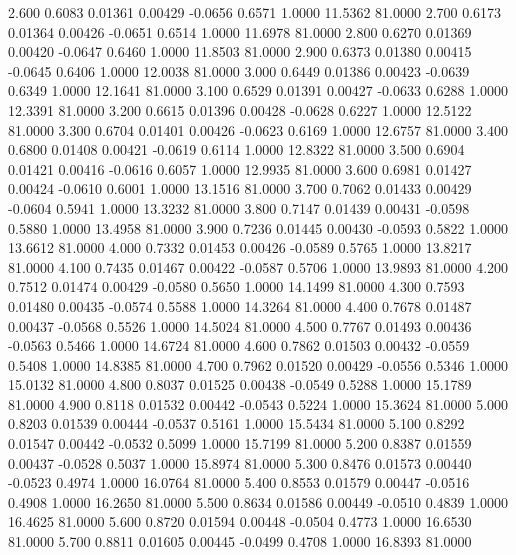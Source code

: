    2.600   0.6083   0.01361   0.00429  -0.0656   0.6571   1.0000  11.5362  81.0000
   2.700   0.6173   0.01364   0.00426  -0.0651   0.6514   1.0000  11.6978  81.0000
   2.800   0.6270   0.01369   0.00420  -0.0647   0.6460   1.0000  11.8503  81.0000
   2.900   0.6373   0.01380   0.00415  -0.0645   0.6406   1.0000  12.0038  81.0000
   3.000   0.6449   0.01386   0.00423  -0.0639   0.6349   1.0000  12.1641  81.0000
   3.100   0.6529   0.01391   0.00427  -0.0633   0.6288   1.0000  12.3391  81.0000
   3.200   0.6615   0.01396   0.00428  -0.0628   0.6227   1.0000  12.5122  81.0000
   3.300   0.6704   0.01401   0.00426  -0.0623   0.6169   1.0000  12.6757  81.0000
   3.400   0.6800   0.01408   0.00421  -0.0619   0.6114   1.0000  12.8322  81.0000
   3.500   0.6904   0.01421   0.00416  -0.0616   0.6057   1.0000  12.9935  81.0000
   3.600   0.6981   0.01427   0.00424  -0.0610   0.6001   1.0000  13.1516  81.0000
   3.700   0.7062   0.01433   0.00429  -0.0604   0.5941   1.0000  13.3232  81.0000
   3.800   0.7147   0.01439   0.00431  -0.0598   0.5880   1.0000  13.4958  81.0000
   3.900   0.7236   0.01445   0.00430  -0.0593   0.5822   1.0000  13.6612  81.0000
   4.000   0.7332   0.01453   0.00426  -0.0589   0.5765   1.0000  13.8217  81.0000
   4.100   0.7435   0.01467   0.00422  -0.0587   0.5706   1.0000  13.9893  81.0000
   4.200   0.7512   0.01474   0.00429  -0.0580   0.5650   1.0000  14.1499  81.0000
   4.300   0.7593   0.01480   0.00435  -0.0574   0.5588   1.0000  14.3264  81.0000
   4.400   0.7678   0.01487   0.00437  -0.0568   0.5526   1.0000  14.5024  81.0000
   4.500   0.7767   0.01493   0.00436  -0.0563   0.5466   1.0000  14.6724  81.0000
   4.600   0.7862   0.01503   0.00432  -0.0559   0.5408   1.0000  14.8385  81.0000
   4.700   0.7962   0.01520   0.00429  -0.0556   0.5346   1.0000  15.0132  81.0000
   4.800   0.8037   0.01525   0.00438  -0.0549   0.5288   1.0000  15.1789  81.0000
   4.900   0.8118   0.01532   0.00442  -0.0543   0.5224   1.0000  15.3624  81.0000
   5.000   0.8203   0.01539   0.00444  -0.0537   0.5161   1.0000  15.5434  81.0000
   5.100   0.8292   0.01547   0.00442  -0.0532   0.5099   1.0000  15.7199  81.0000
   5.200   0.8387   0.01559   0.00437  -0.0528   0.5037   1.0000  15.8974  81.0000
   5.300   0.8476   0.01573   0.00440  -0.0523   0.4974   1.0000  16.0764  81.0000
   5.400   0.8553   0.01579   0.00447  -0.0516   0.4908   1.0000  16.2650  81.0000
   5.500   0.8634   0.01586   0.00449  -0.0510   0.4839   1.0000  16.4625  81.0000
   5.600   0.8720   0.01594   0.00448  -0.0504   0.4773   1.0000  16.6530  81.0000
   5.700   0.8811   0.01605   0.00445  -0.0499   0.4708   1.0000  16.8393  81.0000
